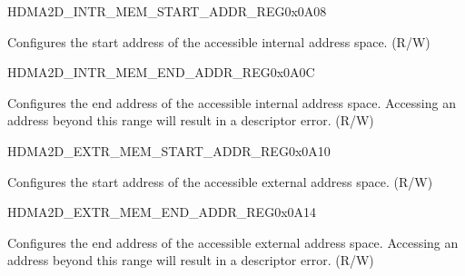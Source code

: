 \begin{register}{H}{DMA2D\_INTR\_MEM\_START\_ADDR\_REG}{0x0A08}\label{regdesc:DMA2DINTRMEMSTARTADDRREG}
%
\regnewline%
\begin{regdesc}\begin{reglist}
\label{fielddesc:DMA2DACCESSINTRMEMSTARTADDR}\item [DMA2D\_ACCESS\_INTR\_MEM\_START\_ADDR] Configures the start address of the accessible internal address space. (R/W)
\end{reglist}\end{regdesc}
\end{register}


\begin{register}{H}{DMA2D\_INTR\_MEM\_END\_ADDR\_REG}{0x0A0C}\label{regdesc:DMA2DINTRMEMENDADDRREG}
%
\regnewline%
\begin{regdesc}\begin{reglist}
\label{fielddesc:DMA2DACCESSINTRMEMENDADDR}\item [DMA2D\_ACCESS\_INTR\_MEM\_END\_ADDR] Configures the end address of the accessible internal address space. Accessing an address beyond this range will result in a descriptor error. (R/W)
\end{reglist}\end{regdesc}
\end{register}


\begin{register}{H}{DMA2D\_EXTR\_MEM\_START\_ADDR\_REG}{0x0A10}\label{regdesc:DMA2DEXTRMEMSTARTADDRREG}
%
\regnewline%
\begin{regdesc}\begin{reglist}
\label{fielddesc:DMA2DACCESSEXTRMEMSTARTADDR}\item [DMA2D\_ACCESS\_EXTR\_MEM\_START\_ADDR] Configures the start address of the accessible external address space. (R/W)
\end{reglist}\end{regdesc}
\end{register}


\begin{register}{H}{DMA2D\_EXTR\_MEM\_END\_ADDR\_REG}{0x0A14}\label{regdesc:DMA2DEXTRMEMENDADDRREG}
%
\regnewline%
\begin{regdesc}\begin{reglist}
\label{fielddesc:DMA2DACCESSEXTRMEMENDADDR}\item [DMA2D\_ACCESS\_EXTR\_MEM\_END\_ADDR] Configures the end address of the accessible external address space. Accessing an address beyond this range will result in a descriptor error. (R/W)
\end{reglist}\end{regdesc}
\end{register}


